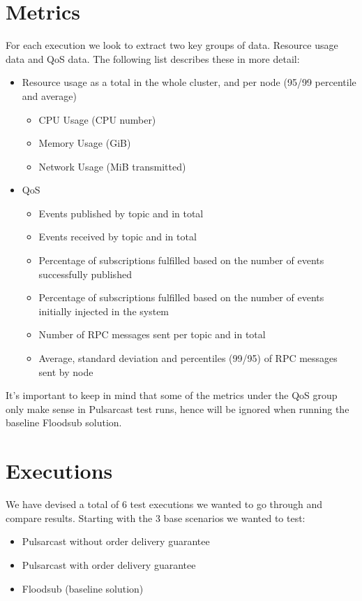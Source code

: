 \section{Metrics}\label{metrics}

For each execution we look to extract two key groups of data. Resource usage
data and QoS data. The following list describes these in more detail:

\begin{itemize}
  \item Resource usage as a total in the whole cluster, and per node (95/99
  percentile and average)
  \begin{itemize}
    \item CPU Usage (CPU number)
    \item Memory Usage (GiB)
    \item Network Usage (MiB transmitted)
  \end{itemize}
  \item QoS
  \begin{itemize}
    \item Events published by topic and in total
    \item Events received by topic and in total
    \item Percentage of subscriptions fulfilled based on the number of events
    successfully published
    \item Percentage of subscriptions fulfilled based on the number of events
    initially injected in the system
    \item Number of RPC messages sent per topic and in total
    \item Average, standard deviation and percentiles (99/95) of RPC messages
    sent by node
  \end{itemize}
\end{itemize}

It's important to keep in mind that some of the metrics under the QoS group
only make sense in Pulsarcast test runs, hence will be ignored when running the
baseline Floodsub solution.

\section{Executions}\label{executions}

We have devised a total of 6 test executions we wanted to go through and
compare results. Starting with the 3 base scenarios we wanted to test:

\begin{itemize}
  \item Pulsarcast without order delivery guarantee
  \item Pulsarcast with order delivery guarantee
  \item Floodsub (baseline solution)
\end{itemize}

